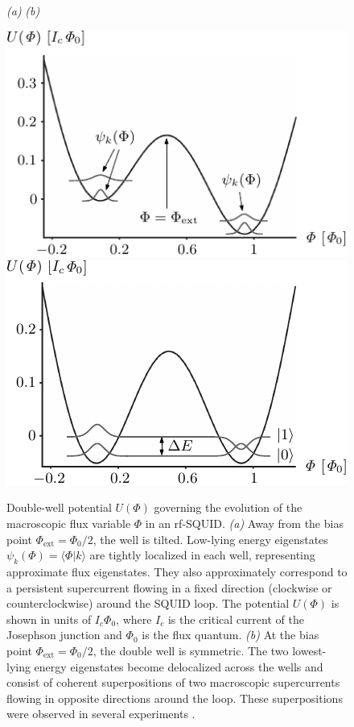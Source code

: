 \documentclass[3p,sort&compress,12pt]{elsarticle}
\newcommand{\braket}[2]{\ensuremath{{\langle #1}|{#2 \rangle}}}
\begin{document}
\begin{figure}
{\footnotesize \hspace{1cm} \emph{(a)} \hspace{6.8cm} \emph{(b)} }

\vspace{.2cm}

  \centering
\includegraphics[scale=0.85]{squidpot0.pdf} \hspace{1cm}\includegraphics[scale=0.85]{biaspt.pdf}
\caption{Double-well potential $U(\Phi)$ governing the evolution of the macroscopic flux variable $\Phi$ in an rf-SQUID. \emph{(a)} Away from the bias point $\Phi_\text{ext} = \Phi_0/2$, the well is tilted. Low-lying energy eigenstates $\psi_k(\Phi) =\braket{\Phi}{k}$ are tightly localized in each well, representing approximate flux eigenstates. They also approximately correspond to a persistent supercurrent flowing in a fixed direction (clockwise or counterclockwise) around the SQUID loop. The potential $U(\Phi)$ is shown in units of $I_c \Phi_0$, where $I_c$ is the critical current of the Josephson junction and $\Phi_0$ is the flux quantum. \emph{(b)} At the bias point $\Phi_\text{ext} = \Phi_0/2$, the double well is symmetric. The two lowest-lying energy eigenstates become delocalized across the wells and consist of coherent superpositions of two macroscopic supercurrents flowing in opposite directions around the loop. These superpositions were observed in several experiments \cite{Friedman:2000:rr,Wal:2000:om,Chiorescu:2003:ta,Ilichev:2003:tv}.}
\label{fig:squidpot0} 
\end{figure}
\end{document}
